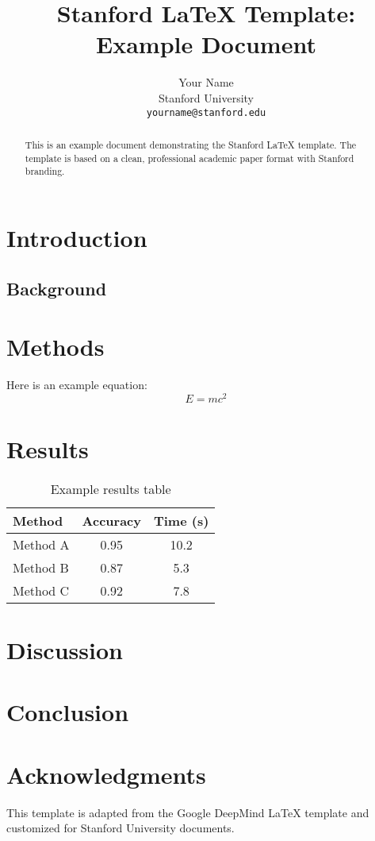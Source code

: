 \documentclass[11pt, a4paper, logo]{stanford}
\title{Stanford LaTeX Template: Example Document}
\author{Your Name\\
Stanford University\\
\texttt{yourname@stanford.edu}}
\begin{document}
\maketitle

\begin{abstract}
This is an example document demonstrating the Stanford LaTeX template. The template is based on a clean, professional academic paper format with Stanford branding.
\end{abstract}

\tableofcontents

\section{Introduction}

\lipsum[1-2]

\subsection{Background}

\lipsum[3]

\section{Methods}

Here is an example equation:
\begin{equation}
E = mc^2
\end{equation}

\lipsum[4]

\section{Results}

\begin{table}[h]
\centering
\caption{Example results table}
\label{tab:example}
\begin{tabular}{lcc}
\toprule
Method & Accuracy & Time (s) \\
\midrule
Method A & 0.95 & 10.2 \\
Method B & 0.87 & 5.3 \\
Method C & 0.92 & 7.8 \\
\bottomrule
\end{tabular}
\end{table}

\lipsum[6]

\section{Discussion}

\lipsum[7-8]

\section{Conclusion}

\lipsum[9]

\section*{Acknowledgments}

This template is adapted from the Google DeepMind LaTeX template and customized for Stanford University documents.
\end{document}
